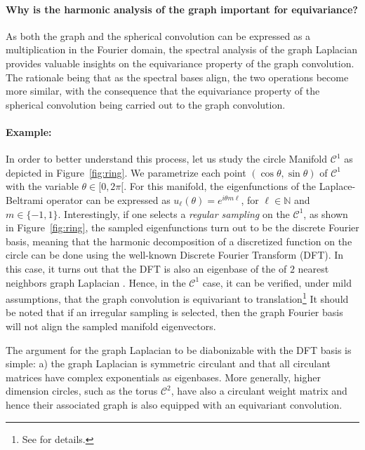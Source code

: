 \documentclass{article} %
\newcommand{\figref}[1]{Figure~\ref{fig:#1}}
\newcommand{\1}{\b{1}}              %
\newcommand{\0}{\b{0}}              %
\newcommand{\todo}[1]{{\color[rgb]{.6,.1,.6}{#1}}}
\begin{document}

\paragraph{Why is the harmonic analysis of the graph important for equivariance?} 
As both the graph and the spherical convolution can be expressed as a multiplication in the Fourier domain, the spectral analysis of the graph Laplacian provides valuable insights on the equivariance property of the graph convolution. 
The rationale being that as the spectral bases align, the two operations become more similar, with the consequence that the equivariance property of the spherical convolution being carried out to the graph convolution. 


\paragraph{Example:} 
In order to better understand this process, let us study the circle Manifold $\mathcal{C}^1$ as depicted in \figref{ring}. We parametrize each point $(\cos\theta,\sin\theta)$ of $\mathcal{C}^1$ with the variable $\theta\in[0,2\pi[$.
For this manifold, the eigenfunctions of the Laplace-Beltrami operator can be expressed as $u_\ell(\theta)=e^{i \theta m \ell}$, for $\ell \in \mathbb{N}$ and $m\in\{-1,1\}$. 
Interestingly, if one selects a \emph{regular sampling} on the $\mathcal{C}^1$, as shown in \figref{ring}, the sampled eigenfunctions turn out to be the discrete Fourier basis, meaning that the harmonic decomposition of a discretized function on the circle can be done using the well-known Discrete Fourier Transform (DFT). 
In this case, it turns out that the DFT is also an eigenbase of the of $2$ nearest neighbors graph Laplacian \cite{strang1999discrete}. Hence, in the $\mathcal{C}^1$ case, it can be verified, under mild assumptions, that the graph convolution is equivariant to translation\footnote{See \cite[section 2.2 and Equation3]{perraudin2017stationary} for details.}  
It should be noted that if an irregular sampling is selected, then the graph Fourier basis will not align the sampled manifold eigenvectors. 

The argument for the graph Laplacian to be diabonizable with the DFT basis is simple: a) the graph Laplacian is symmetric circulant and that all circulant matrices have complex exponentials as eigenbases. 
More generally, higher dimension circles, such as the torus $\mathcal{C}^2$, have also a circulant weight matrix and hence their associated graph is also equipped with an equivariant convolution.
\end{document}
